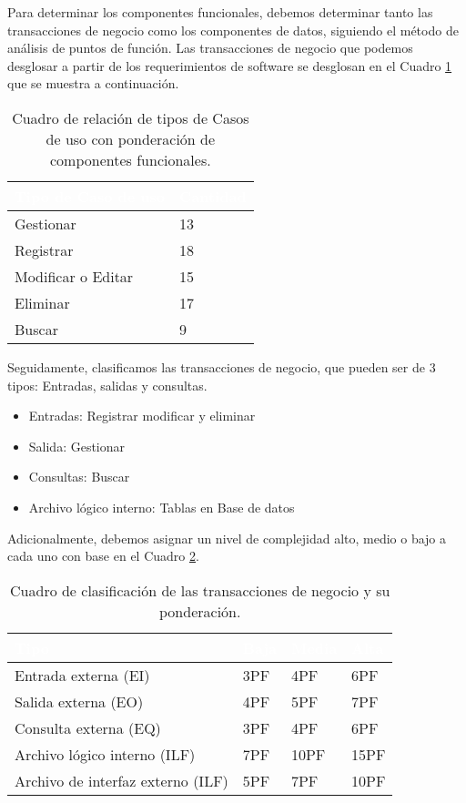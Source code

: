 Para determinar los componentes funcionales, debemos determinar tanto las transacciones de negocio como los componentes de datos, siguiendo el método de análisis de puntos de función.  Las transacciones de negocio que podemos desglosar a partir de los requerimientos de software se desglosan en el Cuadro \ref{tbl:componentesf} que se muestra a continuación.

\begin{table}[H]
	\centering
	\begin{tabular}{|p{4cm}|p{4cm}|}
		\hline
		\rowcolor{black} \textcolor{white} {\textbf{Tipo de Caso de uso}} & \textcolor{white}{\textbf{Cantidad}} \\ \hline
		Gestionar & 13  \\
		\hline
		Registrar & 18  \\
		\hline
		Modificar o Editar & 15  \\
		\hline
		Eliminar & 17  \\
		\hline
		Buscar & 9  \\
		\hline
	\end{tabular}
	 \caption{Cuadro de relación de tipos de Casos de uso con ponderación de componentes funcionales.}
	 \label{tbl:componentesf}
\end{table}

Seguidamente, clasificamos las transacciones de negocio, que pueden ser de 3 tipos: Entradas, salidas y consultas. 

\begin{itemize}
\item Entradas: Registrar modificar y eliminar
\item Salida: Gestionar
\item Consultas: Buscar
\item Archivo lógico interno: Tablas en Base de datos

\end{itemize}

Adicionalmente, debemos asignar un nivel de complejidad alto, medio o bajo a cada uno con base en el Cuadro \ref{tbl:clasif}.

	\begin{table}[H]
	\centering
	\begin{tabular}{|p{3cm}|p{1cm}|p{1cm}|p{1cm}|}
		\hline
		\rowcolor{black} \textcolor{white} {\textbf{Tipo}} & \textcolor{white}{\textbf{Baja}} & \textcolor{white}{\textbf{Media}} & \textcolor{white}{\textbf{Alta}} \\ \hline
		Entrada  externa (EI) & 3PF & 4PF & 6PF  \\
		\hline
		Salida  externa (EO) & 4PF & 5PF & 7PF  \\
		\hline
		Consulta  externa (EQ) & 3PF & 4PF & 6PF  \\
		\hline
		Archivo lógico interno (ILF) & 7PF & 10PF & 15PF  \\
		\hline
		Archivo de interfaz externo (ILF) & 5PF & 7PF & 10PF  \\
		\hline
	\end{tabular}
	\caption{Cuadro de clasificación de las transacciones de negocio y su ponderación.}
	\label{tbl:clasif}
\end{table}

